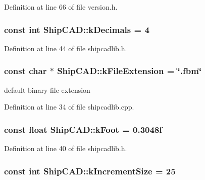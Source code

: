 Definition at line 66 of file version.\-h.

\hypertarget{namespaceShipCAD_ac88ffd27e117a3e612997a36a5d4616d}{
\subsubsection[{k\-Decimals}]{\setlength{\rightskip}{0pt plus 5cm}const int Ship\-C\-A\-D\-::k\-Decimals = 4}}\label{namespaceShipCAD_ac88ffd27e117a3e612997a36a5d4616d}


Definition at line 44 of file shipcadlib.\-h.

\hypertarget{namespaceShipCAD_a6461e4d91e555f0c732b53f8998b325d}{
\subsubsection[{k\-File\-Extension}]{\setlength{\rightskip}{0pt plus 5cm}const char $\ast$ Ship\-C\-A\-D\-::k\-File\-Extension = \char`\"{}.fbm\char`\"{}}}\label{namespaceShipCAD_a6461e4d91e555f0c732b53f8998b325d}
default binary file extension 

Definition at line 34 of file shipcadlib.\-cpp.

\hypertarget{namespaceShipCAD_a8c1484188fed1e735c5a94f64a6817ab}{
\subsubsection[{k\-Foot}]{\setlength{\rightskip}{0pt plus 5cm}const float Ship\-C\-A\-D\-::k\-Foot = 0.\-3048f}}\label{namespaceShipCAD_a8c1484188fed1e735c5a94f64a6817ab}


Definition at line 40 of file shipcadlib.\-h.

\hypertarget{namespaceShipCAD_a1c0de7dc4306d7908bd8c6f7ff69ecdc}{
\subsubsection[{k\-Increment\-Size}]{\setlength{\rightskip}{0pt plus 5cm}const int Ship\-C\-A\-D\-::k\-Increment\-Size = 25}}\label{namespaceShipCAD_a1c0de7dc4306d7908bd8c6f7ff69ecdc}


